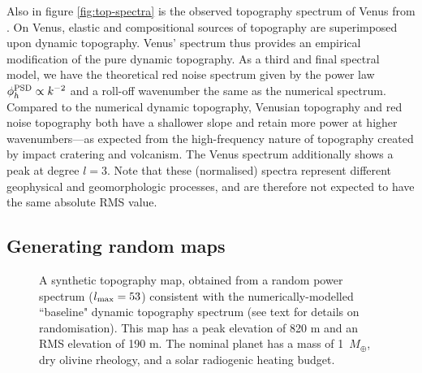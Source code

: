 \documentclass[trackchanges]{aastex63}
\begin{document}
Also in figure \ref{fig:top-spectra} is the observed topography spectrum of Venus from \citet{wieczorek_gravity_2015}. On Venus, elastic and compositional sources of topography are superimposed upon dynamic topography. Venus' spectrum thus provides an empirical modification of the pure dynamic topography. As a third and final spectral model, we have the theoretical red noise spectrum given by the power law $\phi^{\rm PSD}_h \propto k^{-2}$ and a roll-off wavenumber the same as the numerical spectrum. Compared to the numerical dynamic topography, Venusian topography and red noise topography both have a shallower slope and retain more power at higher wavenumbers---as expected from the high-frequency nature of topography created by impact cratering and volcanism. The Venus spectrum additionally shows a peak at degree $l=3$. Note that these (normalised) spectra represent different geophysical and geomorphologic processes, and are therefore not expected to have the same absolute RMS value.


\subsection{Generating random maps} \label{sec:spectral-repeat-top}


\begin{figure}
    \centering
    \caption{A synthetic topography map, obtained from a random power spectrum ($l_{\rm max} = 53$) consistent with the numerically-modelled ``baseline" dynamic topography spectrum (see text for details on randomisation). This map has a peak elevation of 820 m and an RMS elevation of 190 m. The nominal planet has a mass of 1~$M_\oplus$, dry olivine rheology, and a solar radiogenic heating budget.
    \label{fig:synth-map}}
\end{figure}
\end{document}

